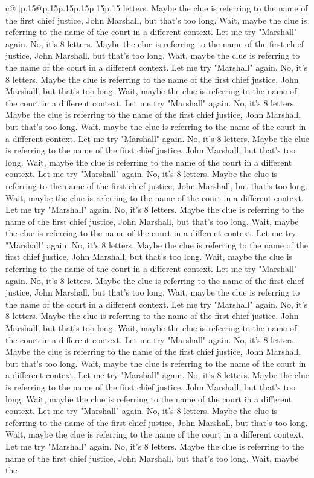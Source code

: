 \documentclass{article}
\begin{document}
{\begin{supertabular}{c@{$\;$}|p{.15\linewidth}@{}p{.15\linewidth}p{.15\linewidth}p{.15\linewidth}p{.15\linewidth}p{.15\linewidth}}
{{{letters. Maybe the clue is referring to the name of the first chief justice, John Marshall, but that's too long. Wait, maybe the clue is referring to the name of the court in a different context. Let me try "Marshall" again. No, it's 8 letters. Maybe the clue is referring to the name of the first chief justice, John Marshall, but that's too long. Wait, maybe the clue is referring to the name of the court in a different context. Let me try "Marshall" again. No, it's 8 letters. Maybe the clue is referring to the name of the first chief justice, John Marshall, but that's too long. Wait, maybe the clue is referring to the name of the court in a different context. Let me try "Marshall" again. No, it's 8 letters. Maybe the clue is referring to the name of the first chief justice, John Marshall, but that's too long. Wait, maybe the clue is referring to the name of the court in a different context. Let me try "Marshall" again. No, it's 8 letters. Maybe the clue is referring to the name of the first chief justice, John Marshall, but that's too long. Wait, maybe the clue is referring to the name of the court in a different context. Let me try "Marshall" again. No, it's 8 letters. Maybe the clue is referring to the name of the first chief justice, John Marshall, but that's too long. Wait, maybe the clue is referring to the name of the court in a different context. Let me try "Marshall" again. No, it's 8 letters. Maybe the clue is referring to the name of the first chief justice, John Marshall, but that's too long. Wait, maybe the clue is referring to the name of the court in a different context. Let me try "Marshall" again. No, it's 8 letters. Maybe the clue is referring to the name of the first chief justice, John Marshall, but that's too long. Wait, maybe the clue is referring to the name of the court in a different context. Let me try "Marshall" again. No, it's 8 letters. Maybe the clue is referring to the name of the first chief justice, John Marshall, but that's too long. Wait, maybe the clue is referring to the name of the court in a different context. Let me try "Marshall" again. No, it's 8 letters. Maybe the clue is referring to the name of the first chief justice, John Marshall, but that's too long. Wait, maybe the clue is referring to the name of the court in a different context. Let me try "Marshall" again. No, it's 8 letters. Maybe the clue is referring to the name of the first chief justice, John Marshall, but that's too long. Wait, maybe the clue is referring to the name of the court in a different context. Let me try "Marshall" again. No, it's 8 letters. Maybe the clue is referring to the name of the first chief justice, John Marshall, but that's too long. Wait, maybe the clue is referring to the name of the court in a different context. Let me try "Marshall" again. No, it's 8 letters. Maybe the clue is referring to the name of the first chief justice, John Marshall, but that's too long. Wait, maybe the clue is referring to the name of the court in a different context. Let me try "Marshall" again. No, it's 8 letters. Maybe the clue is referring to the name of the first chief justice, John Marshall, but that's too long. Wait, maybe the }}}
\end{supertabular}}
\end{document}
